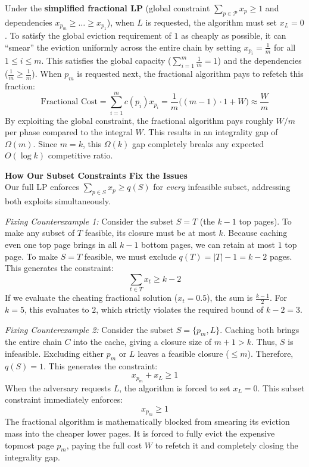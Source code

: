 \documentclass[a4paper]{article}
\begin{document}
Under the \textbf{simplified fractional LP} (global constraint $\sum_{p \in \mathcal{P}} x_p \ge 1$ and dependencies $x_{p_m} \ge \dots \ge x_{p_1}$), when $L$ is requested, the algorithm must set $x_L = 0$. To satisfy the global eviction requirement of $1$ as cheaply as possible, it can ``smear'' the eviction uniformly across the entire chain by setting $x_{p_i} = \frac{1}{m}$ for all $1 \le i \le m$. 
This satisfies the global capacity ($\sum_{i=1}^m \frac{1}{m} = 1$) and the dependencies ($\frac{1}{m} \ge \frac{1}{m}$). When $p_m$ is requested next, the fractional algorithm pays to refetch this fraction:
$$ \text{Fractional Cost} = \sum_{i=1}^m c(p_i) x_{p_i} = \frac{1}{m} \Big( (m-1)\cdot 1 + W \Big) \approx \frac{W}{m} $$
By exploiting the global constraint, the fractional algorithm pays roughly $W/m$ per phase compared to the integral $W$. This results in an integrality gap of $\Omega(m)$. Since $m = k$, this $\Omega(k)$ gap completely breaks any expected $O(\log k)$ competitive ratio.

\textbf{How Our Subset Constraints Fix the Issues} \\
Our full LP enforces $\sum_{p \in S} x_p \ge q(S)$ for \textit{every} infeasible subset, addressing both exploits simultaneously.

\textit{Fixing Counterexample 1:} Consider the subset $S = T$ (the $k-1$ top pages). To make any subset of $T$ feasible, its closure must be at most $k$. Because caching even one top page brings in all $k-1$ bottom pages, we can retain at most $1$ top page. To make $S = T$ feasible, we must exclude $q(T) = |T| - 1 = k - 2$ pages. This generates the constraint:
$$ \sum_{t \in T} x_t \ge k - 2 $$
If we evaluate the cheating fractional solution ($x_t = 0.5$), the sum is $\frac{k-1}{2}$. For $k = 5$, this evaluates to $2$, which strictly violates the required bound of $k-2 = 3$. 

\textit{Fixing Counterexample 2:} Consider the subset $S = \{p_m, L\}$. Caching both brings the entire chain $C$ into the cache, giving a closure size of $m+1 > k$. Thus, $S$ is infeasible. Excluding either $p_m$ or $L$ leaves a feasible closure ($\le m$). Therefore, $q(S) = 1$. This generates the constraint:
$$ x_{p_m} + x_L \ge 1 $$
When the adversary requests $L$, the algorithm is forced to set $x_L = 0$. This subset constraint immediately enforces:
$$ x_{p_m} \ge 1 $$
The fractional algorithm is mathematically blocked from smearing its eviction mass into the cheaper lower pages. It is forced to fully evict the expensive topmost page $p_m$, paying the full cost $W$ to refetch it and completely closing the integrality gap.
\end{document}
